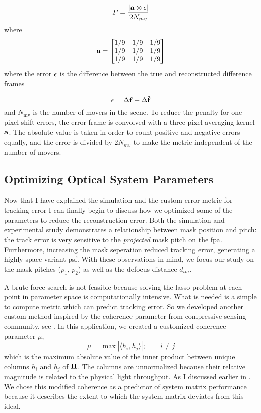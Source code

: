 \begin{equation}
	P = \frac{ | \mathbf{a}   \otimes \mathbf{\epsilon} |}{2N_{mv}}
	\label{eq:scoutErrorMetric}
\end{equation}
%
where
%
\begin{equation}
	\mathbf{a} = 
	\begin{bmatrix}
	    1/9 & 1/9 & 1/9 \\
	    1/9 & 1/9 & 1/9 \\
	    1/9 & 1/9 & 1/9 
	\end{bmatrix}
\end{equation}
%
where the error $\mathbf{\epsilon}$ is the difference between the true and reconstructed difference frames
%

\begin{equation}
	\mathbf{\epsilon} = \Delta \mathbf{f} - \Delta \hat{ \mathbf{f} }
\end{equation}
%
and $N_{\text{mv}}$ is the number of movers in the scene. To reduce the penalty for one-pixel shift errors, the error frame is convolved with a three pixel averaging kernel $\mathbf{a}$. The absolute value is taken in order to count positive and negative errors equally, and the error is divided by $2N_{mv}$ to make the metric independent of the number of movers. 

\subsection{Optimizing Optical System Parameters}

Now that I have explained the simulation and the custom error metric for tracking error I can finally begin to discuss how we optimized some of the parameters to reduce the reconstruction error. Both the simulation and experimental study demonstrates a relationship between mask position and pitch: the track error is very sensitive to the \emph{projected} mask pitch on the \gls{fpa}. Furthermore, increasing the mask seperation reduced tracking error, generating a highly space-variant \gls{psf}. With these observations in mind, we focus our study on the mask pitches ($p_1$, $p_2$) as well as the defocus distance $d_{im}$. 

A brute force search is not feasible because solving the lasso problem at each point in parameter space is computationally intensive. What is needed is a simple to compute metric which can predict tracking error. So we developed another custom method inspired by the coherence parameter from compressive sensing community, see . In this application, we created a customized coherence parameter $\mu$, 
%
\begin{equation}\label{defofcoherence}
    \mu = \max{\left| \langle h_i, h_j \rangle \right|} ;  \qquad i \neq j
\end{equation}
%
which is the maximum absolute value of the inner product between unique columns $h_i$ and $h_j$ of $\mathbf{H}$. The columns are unnormalized because their relative magnitude is related to the physical light throughput. As I discussed earlier in . We chose this modified coherence as a predictor of system matrix performance because it describes the extent to which the system matrix deviates from this ideal.


